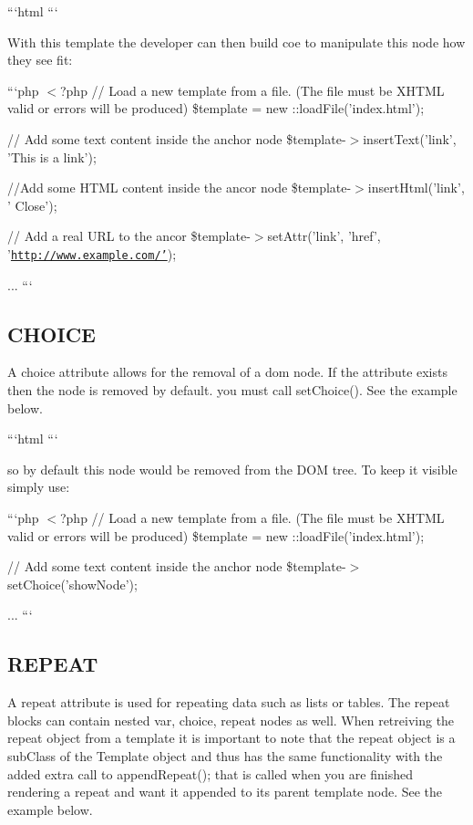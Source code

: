 ```html \href{#}{\tt } ```

With this template the developer can then build coe to manipulate this node how they see fit\+:

```php $<$?php // Load a new template from a file. (The file must be X\+H\+T\+M\+L valid or errors will be produced) \$template = new \+::load\+File('index.\+html');

// Add some text content inside the anchor node \$template-\/$>$insert\+Text('link', 'This is a link');

//\+Add some H\+T\+M\+L content inside the ancor node \$template-\/$>$insert\+Html('link', '{\itshape } Close');

// Add a real U\+R\+L to the ancor \$template-\/$>$set\+Attr('link', 'href', '\href{http://www.example.com/'}{\tt http\+://www.\+example.\+com/'});

... ```

\subsection*{C\+H\+O\+I\+C\+E}

A {\ttfamily choice} attribute allows for the removal of a dom node. If the attribute exists then the node is removed by default. you must call set\+Choice(). See the example below.

```html \href{#}{\tt } ```

so by default this node would be removed from the D\+O\+M tree. To keep it visible simply use\+:

```php $<$?php // Load a new template from a file. (The file must be X\+H\+T\+M\+L valid or errors will be produced) \$template = new \+::load\+File('index.\+html');

// Add some text content inside the anchor node \$template-\/$>$set\+Choice('show\+Node');

... ```

\subsection*{R\+E\+P\+E\+A\+T}

A {\ttfamily repeat} attribute is used for repeating data such as lists or tables. The {\ttfamily repeat} blocks can contain nested {\ttfamily var}, {\ttfamily choice}, {\ttfamily repeat} nodes as well. When retreiving the {\ttfamily repeat} object from a template it is important to note that the repeat object is a sub\+Class of the Template object and thus has the same functionality with the added extra call to append\+Repeat(); that is called when you are finished rendering a {\ttfamily repeat} and want it appended to its parent template node. See the example below.


